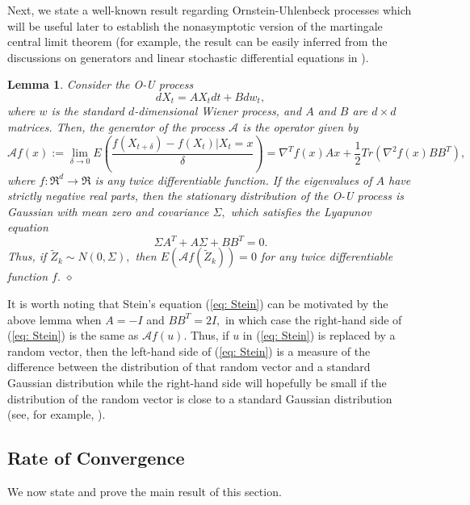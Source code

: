 \documentclass[11pt]{article}
\newtheorem{lemma}{Lemma}
\begin{document}
Next, we state a well-known result regarding Ornstein-Uhlenbeck processes which will be useful later to establish the nonasymptotic version of the martingale central limit theorem  (for example, the result can be easily inferred from the discussions on generators and linear stochastic differential equations in \citep{arnold1974stochastic}).
\begin{lemma}\label{lem: O-U}
    Consider the O-U process
    $$dX_t=AX_tdt+Bdw_t,$$
    where $w$ is the standard $d$-dimensional Wiener process, and $A$ and $B$ are $d\times d$ matrices. Then, the generator of the process $\mathcal{A}$ is the operator given by
    $$\mathcal{A}f(x):=\lim_{\delta\rightarrow 0}E\left(\frac{f(X_{t+\delta})-f(X_t)|X_t=x}{\delta}\right)=\nabla^Tf(x)Ax+\frac{1}{2}Tr(\nabla^2f(x) BB^T),$$
    where $f:\Re^d\rightarrow \Re$ is any twice differentiable function. If the eigenvalues of $A$ have strictly negative real parts, then the stationary distribution of the O-U process is Gaussian with mean zero and covariance $\Sigma,$ which satisfies the Lyapunov equation
    $$\Sigma A^T+A\Sigma+BB^T=0.$$ Thus, if $\tilde{Z}_k\sim N(0,\Sigma),$ then $E(\mathcal{A}f(\tilde{Z}_k))=0$ for any twice differentiable function $f.$
    \hfill $\diamond$
\end{lemma}
It is worth noting that Stein's equation (\ref{eq: Stein}) can be motivated by the above lemma when $A=-I$ and $BB^T=2I,$ in which case the right-hand side of (\ref{eq: Stein}) is the same as $\mathcal{A}f(u)$. Thus, if $u$ in (\ref{eq: Stein}) is replaced by a random vector, then the left-hand side of (\ref{eq: Stein}) is a measure of the difference between the distribution of that random vector and a standard Gaussian distribution while the right-hand side will hopefully be small if the distribution of the random vector is close to a standard Gaussian distribution (see, for example, \citep{barbour1990stein,gotze1991rate,chen2010normal}).




\subsection{Rate of Convergence}

We now state and prove the main result of this section.
\end{document}
